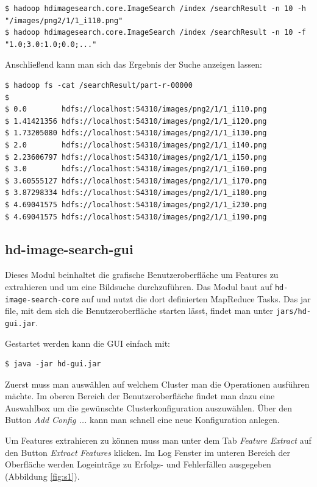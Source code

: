 \documentclass[paper=a4, fontsize=11pt]{scrartcl} %
\numberwithin{equation}{section} %
\numberwithin{figure}{section} %
\numberwithin{table}{section} %
\begin{document}
\begin{lstlisting}
$ hadoop hdimagesearch.core.ImageSearch /index /searchResult -n 10 -h "/images/png2/1/1_i110.png"
$ hadoop hdimagesearch.core.ImageSearch /index /searchResult -n 10 -f "1.0;3.0:1.0;0.0;..."
\end{lstlisting}

Anschließend kann man sich das Ergebnis der Suche anzeigen lassen:
\begin{lstlisting}
$ hadoop fs -cat /searchResult/part-r-00000
$ 
$ 0.0        hdfs://localhost:54310/images/png2/1/1_i110.png
$ 1.41421356 hdfs://localhost:54310/images/png2/1/1_i120.png
$ 1.73205080 hdfs://localhost:54310/images/png2/1/1_i130.png
$ 2.0        hdfs://localhost:54310/images/png2/1/1_i140.png
$ 2.23606797 hdfs://localhost:54310/images/png2/1/1_i150.png
$ 3.0        hdfs://localhost:54310/images/png2/1/1_i160.png
$ 3.60555127 hdfs://localhost:54310/images/png2/1/1_i170.png
$ 3.87298334 hdfs://localhost:54310/images/png2/1/1_i180.png
$ 4.69041575 hdfs://localhost:54310/images/png2/1/1_i230.png
$ 4.69041575 hdfs://localhost:54310/images/png2/1/1_i190.png
\end{lstlisting}

\subsection{hd-image-search-gui}
Dieses Modul beinhaltet die grafische Benutzeroberfläche um Features zu extrahieren und um eine Bildsuche durchzuführen. Das Modul baut auf \lstinline$hd-image-search-core$ auf und nutzt die dort definierten MapReduce Tasks. Das jar file, mit dem sich die Benutzeroberfläche starten lässt, findet man unter \lstinline$jars/hd-gui.jar$.

Gestartet werden kann die GUI einfach mit:
\begin{lstlisting}
$ java -jar hd-gui.jar 
\end{lstlisting}

Zuerst muss man auswählen auf welchem Cluster man die Operationen ausführen mächte. Im oberen Bereich der Benutzeroberfläche findet man dazu eine Auswahlbox um die gewünschte Clusterkonfiguration auszuwählen. Über den Button \emph{Add Config ...} kann man schnell eine neue Konfiguration anlegen.

Um Features extrahieren zu können muss man unter dem Tab \emph{Feature Extract} auf den Button \emph{Extract Features} klicken. Im Log Fenster im unteren Bereich der Oberfläche werden Logeinträge zu Erfolgs- und Fehlerfällen ausgegeben (Abbildung \ref{fig:s1}).
\end{document}
